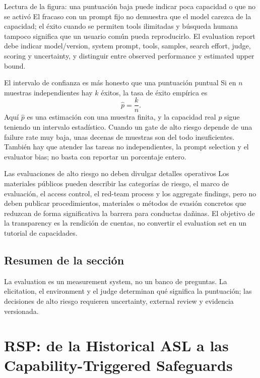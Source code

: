 \documentclass[a4paper]{article}
\begin{document}
\begin{knowledgebox}{Lectura de la figura: una puntuación baja puede indicar poca capacidad o que no se activó}
El fracaso con un prompt fijo no demuestra que el model carezca de la capacidad; el éxito cuando se permiten tools ilimitadas y búsqueda humana tampoco significa que un usuario común pueda reproducirlo. El evaluation report debe indicar model/version, system prompt, tools, samples, search effort, judge, scoring y uncertainty, y distinguir entre observed performance y estimated upper bound.
\end{knowledgebox}

\begin{importantbox}{El intervalo de confianza es más honesto que una puntuación puntual}
Si en $n$ muestras independientes hay $k$ éxitos, la tasa de éxito empírica es
\[
\hat p=\frac{k}{n}.
\]
Aquí $\hat p$ es una estimación con una muestra finita, y la capacidad real $p$ sigue teniendo un intervalo estadístico. Cuando un gate de alto riesgo depende de una failure rate muy baja, unas decenas de muestras son del todo insuficientes. También hay que atender las tareas no independientes, la prompt selection y el evaluator bias; no basta con reportar un porcentaje entero.
\end{importantbox}

\begin{warningbox}{Las evaluaciones de alto riesgo no deben divulgar detalles operativos}
Los materiales públicos pueden describir las categorías de riesgo, el marco de evaluación, el access control, el red-team process y los aggregate findings, pero no deben publicar procedimientos, materiales o métodos de evasión concretos que reduzcan de forma significativa la barrera para conductas dañinas. El objetivo de la transparency es la rendición de cuentas, no convertir el evaluation set en un tutorial de capacidades.
\end{warningbox}

\subsection{Resumen de la sección}

La evaluation es un measurement system, no un banco de preguntas. La elicitation, el environment y el judge determinan qué significa la puntuación; las decisiones de alto riesgo requieren uncertainty, external review y evidencia versionada.
\section{RSP: de la Historical ASL a las Capability-Triggered Safeguards}
\end{document}
